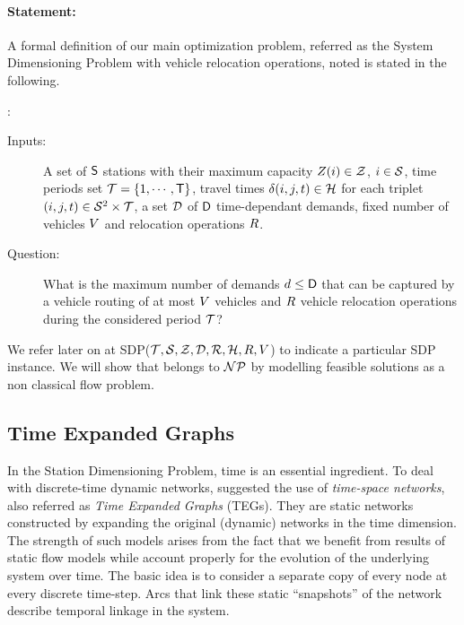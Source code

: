 \paragraph{Statement:}
A formal definition of our main optimization problem, referred as the System Dimensioning Problem with vehicle relocation operations, noted {\SDP} is stated in the following.

\noindent{\SDP}:
\begin{description}
\item[Inputs:] A set of $\mathsf{S}$ stations with their maximum capacity $Z(i) \in \mathcal{Z}$, $i \in \mathcal{S}$, time periods set ${\mathcal{T} = \{1, \cdots, \mathsf{T}\}}$, travel times $\delta(i,j,t) \in \mathcal{H}$ for each triplet $(i,j,t)\in \mathcal{S}^2 \times \mathcal{T}$, a set $\mathcal{D}$ of $\mathsf{D}$ time-dependant demands, fixed number of vehicles $V$ and relocation operations $R$.
\item[Question:]
What is the maximum number of demands $d \leq \mathsf{D}$ that can be captured by a vehicle routing of at most $V$ vehicles and $R$ vehicle relocation operations during the considered period $\mathcal{T}$?
\end{description}
We refer later on at SDP($\mathcal{T}, \mathcal{S}, \mathcal{Z}, \mathcal{D}, \mathcal{R}, \mathcal{H}, R, V$) to indicate a particular SDP instance.
We will show that {\SDP} belongs to ${\cal NP}$ by modelling feasible solutions as a non classical flow problem.

\subsection{Time Expanded Graphs}
In the Station Dimensioning Problem, time is an essential ingredient.
To deal with discrete-time dynamic networks, \cite{ahuja_network_1993} suggested the use of \emph{time-space networks}, also referred as \emph{Time Expanded Graphs} (TEGs). %
They are static networks constructed by expanding the original (dynamic) networks in the time dimension.
The strength of such models arises from the fact that we benefit from results of static flow models while account properly for the evolution of the underlying system over time.
The basic idea is to consider a separate copy of every node at every discrete time-step. %
Arcs that link these static ``snapshots'' of the network describe temporal linkage in the system.

